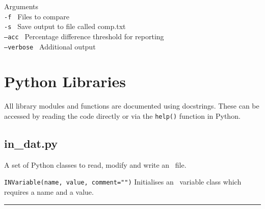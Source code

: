 Arguments\\
\texttt{-f        }     Files to compare\\
\texttt{-s        }     Save output to file called comp.txt\\
\texttt{--acc     }     Percentage difference threshold for reporting\\
\texttt{--verbose }     Additional output\\


\section{Python Libraries}
\label{sec:py_lib}

All library modules and functions are documented using docstrings. These can
be accessed by reading the code directly or via the \texttt{help()} function
in Python.

\subsection{in\_dat.py}

A set of Python classes to read, modify and write an \indat\ file.

\begin{description}

\item{\verb|INVariable(name, value, comment="")| } Initialises an \indat\
  variable class which requires a name and a value.

\end{description}

\rule{\textwidth}{0.4pt}

